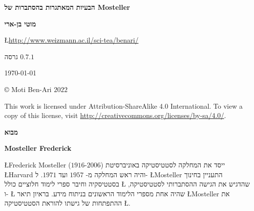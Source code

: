 


\thispagestyle{empty}

\begin{center}
\textbf{\LARGE הבעיות המאתגרות בהסתברות של Mosteller}

\bigskip
\bigskip
\bigskip

\textbf{\Large מוטי בן-ארי}

\bigskip

\L{\url{http://www.weizmann.ac.il/sci-tea/benari/}}

\bigskip
\bigskip
\bigskip

 גרסה
$0.7.1$

\bigskip

\today

\end{center}

\vfill

\begin{center}
\copyright{} Moti Ben-Ari $2022$
 \end{center}
 
\begin{small}
This work is licensed under Attribution-ShareAlike 4.0 International. To view a copy of this license, visit \url{http://creativecommons.org/licenses/by-sa/4.0/}.
\end{small}
\newpage


\tableofcontents

\newpage

\begin{center}
\textbf{\LARGE מבוא}
\end{center}


\bigskip

\textbf{Mosteller Frederick}

\L{Frederick Mosteller}
($1916$-$2006$)
ייסד את המחלקה לסטטיסטיקה באוניברסיטת 
\L{Harvard}
והיה ראש המחלקה מ-%
$1957$
ועד
$1971$.
ל-%
\L{Mosteller}
התעניין בחינוך בסטטיסקיה וחיבר ספרי לימוד חלוציים כולל 
\L{\cite{pwsa}}
שהדגיש את הגישה ההסתברותי לסטטיסטיקה, ו-%
\L{\cite{bsda}}
שהיה אחת מספרי הלימוד הראשונים בניתוח מידע. בראיון תיאר 
\L{Mosteller}
את ההתפתחות של גישתו להוראת הסטטיסטיקה
\L{\cite{gse}}.

